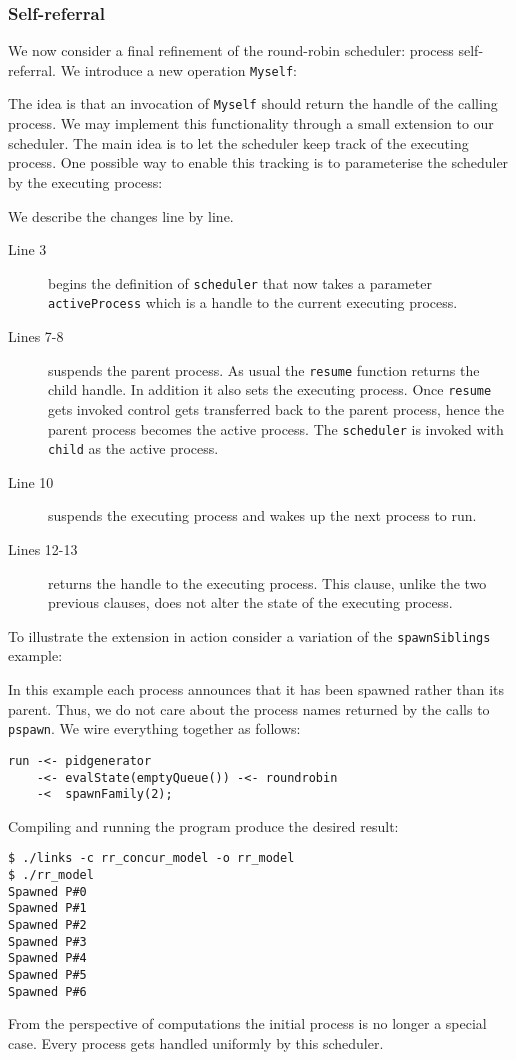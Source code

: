 \documentclass[12pt,mscres,cdtppar,twoside,openright,logo,rightchapter,normalheadings]{infthesis}
\newcommand{\snippet}[1]{}
\theoremstyle{definition}
\begin{document}
\subsubsection{Self-referral}

We now consider a final refinement of the round-robin scheduler:
process self-referral. We introduce a new operation \lstinline$Myself$:
%
\snippet{myself.links}
%
The idea is that an invocation of \lstinline$Myself$ should return the
handle of the calling process. We may implement this functionality
through a small extension to our scheduler. The main idea is to let
the scheduler keep track of the executing process. One possible way to
enable this tracking is to parameterise the scheduler by the executing
process:
%

%
We describe the changes line by line.
\begin{description}
\item[Line 3] begins the definition of \lstinline$scheduler$ that now
  takes a parameter \lstinline$activeProcess$ which is a handle to the
  current executing process.
\item[Lines 7-8] suspends the parent process. As usual the
  \lstinline$resume$ function returns the child handle. In addition it
  also sets the executing process. Once \lstinline$resume$ gets
  invoked control gets transferred back to the parent process, hence
  the parent process becomes the active process.  The
  \lstinline$scheduler$ is invoked with \lstinline$child$ as the
  active process.
\item[Line 10] suspends the executing process and wakes up the next
  process to run.
\item[Lines 12-13] returns the handle to the executing process. This
  clause, unlike the two previous clauses, does not alter the state of
  the executing process.
\end{description}

To illustrate the extension in action consider a variation of the
\lstinline$spawnSiblings$ example:
%

%
In this example each process announces that it has been spawned rather
than its parent. Thus, we do not care about the process names returned
by the calls to \lstinline$pspawn$. We wire everything together as
follows:
%
\begin{lstlisting}
run -<- pidgenerator 
    -<- evalState(emptyQueue()) -<- roundrobin 
    -<  spawnFamily(2);
\end{lstlisting}
%
Compiling and running the program produce the desired result:
%
\begin{lstlisting}[style=terminal]
$ ./links -c rr_concur_model -o rr_model
$ ./rr_model
Spawned P#0
Spawned P#1
Spawned P#2
Spawned P#3
Spawned P#4
Spawned P#5
Spawned P#6
\end{lstlisting}
%
From the perspective of computations the initial process is no longer
a special case. Every process gets handled uniformly by this
scheduler. 
\end{document}

